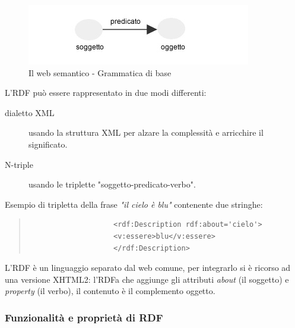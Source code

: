 				\begin{figure}
				\centering
					\includegraphics[scale=0.8]{images/LInformazioneEIlWebSemantico-RDF1}
					\caption{Il web semantico - Grammatica di base}
					\label{fig:LInformazioneEIlWebSemantico-RDF1}
				\end{figure}
				
				L'RDF può essere rappresentato in due modi differenti:
				\begin{description}
					\item[dialetto XML] usando la struttura XML per alzare la complessità e arricchire il significato.
					\item[N-triple] usando le triplette "soggetto-predicato-verbo".
				\end{description}
				Esempio di tripletta della frase \emph{"il cielo è blu"} contenente due stringhe:
				\begin{quote}
				\begin{verbatim}
					<rdf:Description rdf:about='cielo'>
					<v:essere>blu</v:essere>
					</rdf:Description>
				\end{verbatim}
				\end{quote}
				
				L'RDF è un linguaggio separato dal web comune, per integrarlo si è ricorso ad una versione XHTML2: l'RDFa che aggiunge gli attributi \emph{about} (il soggetto) e \emph{property} (il verbo), il contenuto è il complemento oggetto.
				
			
			\subsubsection{Funzionalità e proprietà di RDF}
			
